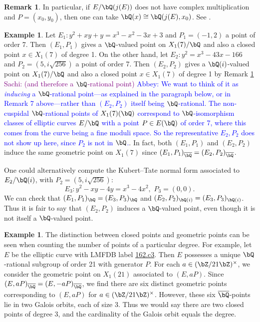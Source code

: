 \documentclass[11pt,reqno]{amsart}
\theoremstyle{plain}
\theoremstyle{definition}
\newtheorem{remark}[theorem]{Remark}
\newtheorem{example}[theorem]{Example}
\newcommand{\Q}{\bQ}
\newcommand{\Z}{\bZ}
\newcommand{\abbey}[1]{\textcolor{blue}{Abbey: #1}}
\newcommand{\sachi}[1]{\textcolor{purple}{Sachi: #1}}
\newcommand{\abedit}[1]{{\color{blue} #1}}
\begin{document}
\begin{remark}\label{ResidueFieldRmk} In particular, if $E/\Q(j(E))$ does not have complex multiplication and $P=(x_0,y_0)$, then one can take $\Q(x)\cong\Q(j(E),x_0)$. See \cite[p. 107]{shimura}.
\end{remark}
\begin{example}
Let $E_1:y^2+xy+y=x^3-x^2-3x+3$ and $P_1=(-1,2)$ a point of order 7. Then $(E_1,P_1)$ gives a $\Q$-valued point on $X_1(7)/\Q$ and also a closed point $x\in X_1(7)$ of degree 1. On the other hand, let $E_2:y^2=x^3-43x-166$ and $P_2=(5,i\sqrt{256})$ a point of order 7. Then $(E_2,P_2)$ gives a $\Q(i)$-valued point on $X_1(7)/\Q$ and also a closed point $x\in X_1(7)$ of degree 1 by \abedit{Remark \ref{ResidueFieldRmk}} \sachi{(and therefore a $\Q$-rational point)} \abbey{We want to think of it as \emph{inducing} a $\Q$-rational point---as explained in the paragraph below, or in Remark 7 above---rather than $(E_2,P_2)$ itself being $\Q$-rational. The non-cuspidal $\Q$-rational points of $X_1(7)(\Q)$ correspond to $\Q$-isomorphism classes of elliptic curves $E/\Q$ with a point $P\in E(\Q)$ of order 7, where this comes from the curve being a fine moduli space. So the representative $E_2,P_2$ does not show up here, since $P_2$ is not in $\Q$.}. In fact, both $(E_1,P_1)$ and $(E_2,P_2)$ induce the same geometric point on $X_1(7)$ since $(E_1,P_1)_{\overline{\Q}}=(E_2,P_2)_{\overline{\Q}}$. 

One could alternatively compute the Kubert--Tate normal form associated to $E_2/\Q(i)$, with $P_2=(5,i\sqrt{256})$:
\[E_3: y^2-xy-4y=x^3-4x^2,\, \, P_3=(0,0).
\]
We can check that $(E_1,P_1)_{\Q}=(E_3,P_3)_{\Q}$ and $(E_2,P_2)_{\Q(i)} =(E_3,P_3)_{\Q(i)}$. Thus it is fair to say that $(E_2,P_2)$ induces a $\Q$-valued point, even though it is not itself a $\Q$-valued point. 
\end{example}

\begin{example}
The distinction between closed points and geometric points can be seen when counting the number of points of a particular degree. For example, let $E$ be the elliptic curve with LMFDB label \href{https://www.lmfdb.org/EllipticCurve/Q/162/c/3}{162.c3}. Then $E$ possesses a unique $\Q$-rational subgroup of order 21 with generator $P$. For each $a \in (\Z/21\Z)^{\times}$, we consider the geometric point on $X_1(21)$ associated to $(E,aP)$. Since $(E,aP)_{\overline{\Q}}=(E,-aP)_{\overline{\Q}}$, we find there are six distinct geometric points corresponding to $(E,aP)$ for $a \in (\Z/21\Z)^{\times}$. However, these six $\overline{\Q}$-points lie in two Galois orbits, each of size 3. Thus we would say there are two closed points of degree 3, and the cardinality of the Galois orbit equals the degree.
\end{example}
\end{document}
